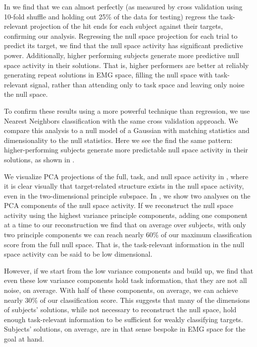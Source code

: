 \documentclass[../main.tex]{subfiles}
\begin{document}

     
     In  we find that we can almost perfectly (as measured by cross validation using 10-fold shuffle and holding out 25\% of the data for testing) regress the task-relevant projection of the hit ends for each subject against their targets, confirming our analysis. Regressing the null space projection for each trial to predict its target, we find that the null space activity has significant predictive power. Additionally, higher performing subjects generate more predictive null space activity in their solutions. That is, higher performers are better at reliably generating repeat solutions in EMG space, filling the null space with task-relevant signal, rather than attending only to task space and leaving only noise the null space.
     
     To confirm these results using a more powerful technique than regression, we use Nearest Neighbors classification with the same cross validation approach. We compare this analysis to a null model of a Gaussian with matching statistics and dimensionality to the null statistics. Here we see the find the same pattern: higher-performing subjects generate more predictable null space activity in their solutions, as shown in .
     
     We visualize PCA projections of the full, task, and null space activity in , where it is clear visually that target-related structure exists in the null space activity, even in the two-dimensional principle subspace. In , we show two analyses on the PCA components of the null space activity. If we reconstruct the null space activity using the highest variance principle components, adding one component at a time to our reconstruction we find that on average over subjects, with only two principle components we can reach nearly 60\% of our maximum classification score from the full null space. That is, the task-relevant information in the null space activity can be said to be low dimensional.
     
     However, if we start from the low variance components and build up, we find that even these low variance components hold task information, that they are not all noise, on average. With half of these components, on average, we can achieve nearly 30\% of our classification score. This suggests that many of the dimensions of subjects' solutions, while not necessary to reconstruct the null space, hold enough task-relevant information to be sufficient for weakly classifying targets. Subjects' solutions, on average, are in that sense bespoke in EMG space for the goal at hand.
     
\end{document}
